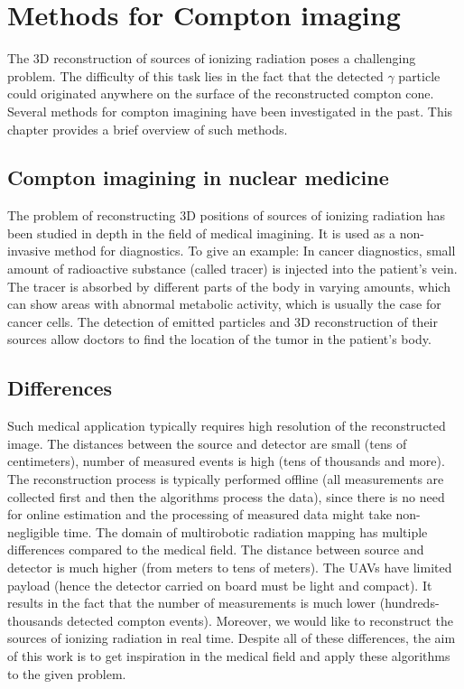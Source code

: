 \chapter{Methods for Compton imaging}
The 3D reconstruction of sources of ionizing radiation poses a challenging problem.
The difficulty of this task lies in the fact that the detected $\gamma$ particle could originated anywhere on the surface of the reconstructed compton cone.
Several methods for compton imagining have been investigated in the past.
This chapter provides a brief overview of such methods.

\section{Compton imagining in nuclear medicine}
The problem of reconstructing 3D positions of sources of ionizing radiation has been studied in depth in the field of medical imagining.
It is used as a non-invasive method for diagnostics.
To give an example:
In cancer diagnostics, small amount of radioactive substance (called tracer) is injected into the patient's vein.
The tracer is absorbed by different parts of the body in varying amounts, which can show areas with abnormal metabolic activity, which is usually the case for cancer cells.
The detection of emitted particles and 3D reconstruction of their sources allow doctors to find the location of the tumor in the patient's body.

\section{Differences}
Such medical application typically requires high resolution of the reconstructed image.
The distances between the source and detector are small (tens of centimeters), number of measured events is high (tens of thousands and more).
The reconstruction process is typically performed offline (all measurements are collected first and then the algorithms process the data), since there is no need for online estimation and the processing of measured data might take non-negligible time.
The domain of multirobotic radiation mapping has multiple differences compared to the medical field.
The distance between source and detector is much higher (from meters to tens of meters).
The \ac{UAV}s have limited payload (hence the detector carried on board must be light and compact).
It results in the fact that the number of measurements is much lower (hundreds-thousands detected compton events).
Moreover, we would like to reconstruct the sources of ionizing radiation in real time.
Despite all of these differences, the aim of this work is to get inspiration in the medical field and apply these algorithms to the given problem.

